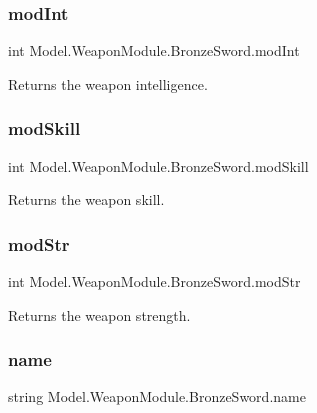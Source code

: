 \subsubsection{\texorpdfstring{mod\+Int}{modInt}}
{\footnotesize\ttfamily int Model.\+Weapon\+Module.\+Bronze\+Sword.\+mod\+Int\hspace{0.3cm}{\ttfamily [get]}}

Returns the weapon intelligence. \hypertarget{class_model_1_1_weapon_module_1_1_bronze_sword_a3e8726ed62fac8f48ce08ce4abb92f19}{}\label{class_model_1_1_weapon_module_1_1_bronze_sword_a3e8726ed62fac8f48ce08ce4abb92f19} 
\subsubsection{\texorpdfstring{mod\+Skill}{modSkill}}
{\footnotesize\ttfamily int Model.\+Weapon\+Module.\+Bronze\+Sword.\+mod\+Skill\hspace{0.3cm}{\ttfamily [get]}}

Returns the weapon skill. \hypertarget{class_model_1_1_weapon_module_1_1_bronze_sword_aa1c6e28081a2ad10cdadec4bb0a527e2}{}\label{class_model_1_1_weapon_module_1_1_bronze_sword_aa1c6e28081a2ad10cdadec4bb0a527e2} 
\subsubsection{\texorpdfstring{mod\+Str}{modStr}}
{\footnotesize\ttfamily int Model.\+Weapon\+Module.\+Bronze\+Sword.\+mod\+Str\hspace{0.3cm}{\ttfamily [get]}}

Returns the weapon strength. \hypertarget{class_model_1_1_weapon_module_1_1_bronze_sword_ae8545ac8a18b0bbab5d8ddad7fc9b2e0}{}\label{class_model_1_1_weapon_module_1_1_bronze_sword_ae8545ac8a18b0bbab5d8ddad7fc9b2e0} 
\subsubsection{\texorpdfstring{name}{name}}
{\footnotesize\ttfamily string Model.\+Weapon\+Module.\+Bronze\+Sword.\+name\hspace{0.3cm}{\ttfamily [get]}}


